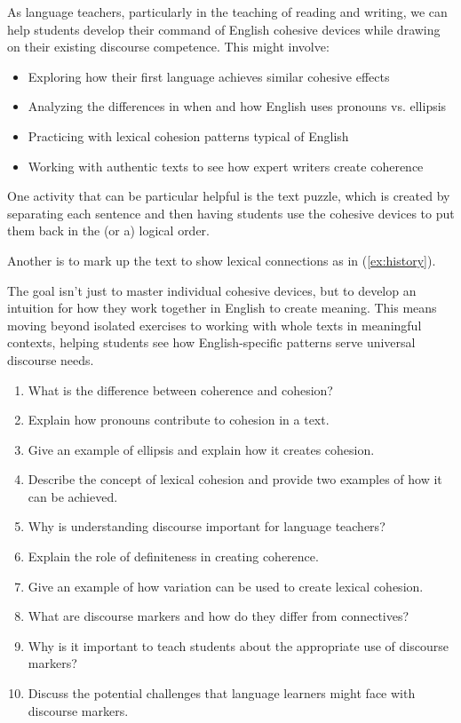 As language teachers, particularly in the teaching of reading and writing, we can help students develop their command of English cohesive devices while drawing on their existing discourse competence. This might involve:

\begin{itemize}[noitemsep]
    \item Exploring how their first language achieves similar cohesive effects
    \item Analyzing the differences in when and how English uses pronouns vs. ellipsis
    \item Practicing with lexical cohesion patterns typical of English
    \item Working with authentic texts to see how expert writers create coherence
\end{itemize}

One activity that can be particular helpful is the text puzzle, which is created by separating each sentence and then having students use the cohesive devices to put them back in the (or a) logical order.

Another is to mark up the text to show lexical connections as in (\ref{ex:history}). 

The goal isn't just to master individual cohesive devices, but to develop an intuition for how they work together in English to create meaning. This means moving beyond isolated exercises to working with whole texts in meaningful contexts, helping students see how English-specific patterns serve universal discourse needs.

\begin{tcolorbox}[title=Exercise: Short-Answer Questions, colback=white, colframe=blue!75!black, fonttitle=\bfseries]

\begin{enumerate}[noitemsep]
    \item What is the difference between coherence and cohesion?
    \item Explain how pronouns contribute to cohesion in a text.
    \item Give an example of ellipsis and explain how it creates cohesion.
    \item Describe the concept of lexical cohesion and provide two examples of how it can be achieved.
    \item Why is understanding discourse important for language teachers?
    \item Explain the role of definiteness in creating coherence.
    \item Give an example of how variation can be used to create lexical cohesion.
    \item What are discourse markers and how do they differ from connectives?
    \item Why is it important to teach students about the appropriate use of discourse markers?
    \item Discuss the potential challenges that language learners might face with discourse markers.
\end{enumerate}

\end{tcolorbox}

